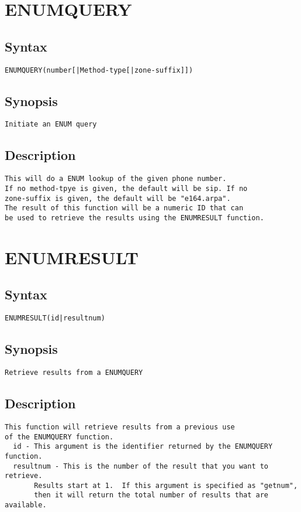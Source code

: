 \section{ENUMQUERY}
\subsection{Syntax}
\begin{verbatim}
ENUMQUERY(number[|Method-type[|zone-suffix]])
\end{verbatim}
\subsection{Synopsis}
\begin{verbatim}
Initiate an ENUM query
\end{verbatim}
\subsection{Description}
\begin{verbatim}
This will do a ENUM lookup of the given phone number.
If no method-tpye is given, the default will be sip. If no
zone-suffix is given, the default will be "e164.arpa".
The result of this function will be a numeric ID that can
be used to retrieve the results using the ENUMRESULT function.

\end{verbatim}


\section{ENUMRESULT}
\subsection{Syntax}
\begin{verbatim}
ENUMRESULT(id|resultnum)
\end{verbatim}
\subsection{Synopsis}
\begin{verbatim}
Retrieve results from a ENUMQUERY
\end{verbatim}
\subsection{Description}
\begin{verbatim}
This function will retrieve results from a previous use
of the ENUMQUERY function.
  id - This argument is the identifier returned by the ENUMQUERY function.
  resultnum - This is the number of the result that you want to retrieve.
       Results start at 1.  If this argument is specified as "getnum",
       then it will return the total number of results that are available.

\end{verbatim}


